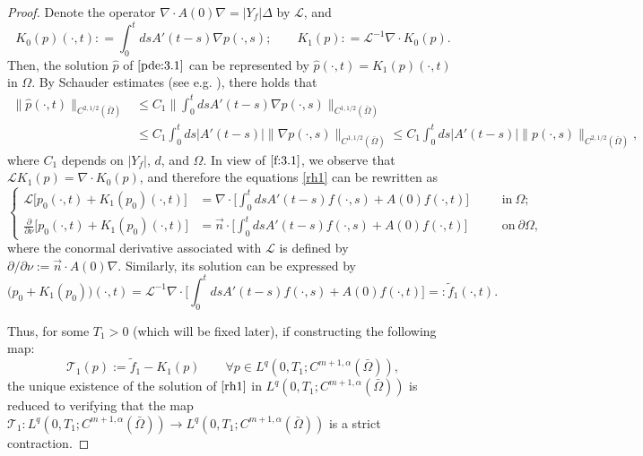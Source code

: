\documentclass[13pt,CJK]{article}
\theoremstyle{plain}                       %
\theoremstyle{remark}
\numberwithin{equation}{section}
\begin{document}
\begin{proof}
Denote the operator $\nabla\cdot A(0)\nabla =|Y_f|\Delta$
by $\mathcal{L}$, and
\begin{equation}\label{f:3.1}
  K_0(p)(\cdot,t): = \int_{0}^{t}dsA'(t-s)\nabla p(\cdot,s);
  \qquad
  K_1(p): = \mathcal{L}^{-1}\nabla\cdot K_0(p).
\end{equation}
Then, the solution $\hat{p}$ of $\eqref{pde:3.1}$ can be represented by
$\hat{p}(\cdot,t) = K_1(p)(\cdot,t)$ in $\Omega$.
By Schauder estimates (see e.g.
\cite[pp.89]{Giaquinta-Martinazzi12}), there holds that
\begin{equation}\label{pde2.28}
\begin{aligned}
\|\hat{p}(\cdot,t)\|_{C^{2,1/2}(\bar\Omega)}&\leq
C_1
\bigg\|\int_{0}^{t}ds
A'(t-s)\nabla p(\cdot,s)\bigg\|_{C^{1,1/2}(\bar\Omega)}\\
&\leq C_1
\int_{0}^{t}ds
|A'(t-s)|\|\nabla p(\cdot,s)\|_{C^{1,1/2}(\bar\Omega)}
\leq C_1\int_{0}^{t}ds
|A'(t-s)|\| p(\cdot,s)\|_{C^{2,1/2}(\bar\Omega)},
\end{aligned}
\end{equation}
where $C_1$ depends on $|Y_f|$, $d$, and $\Omega$.
In view of $\eqref{f:3.1}$, we observe that $\mathcal{L}K_1(p) =
\nabla\cdot K_0(p)$, and therefore the equations \eqref{rh1} can be rewritten as
\begin{equation*}
\left\{
\begin{aligned}
  \mathcal{L}\Big[p_0(\cdot,t)+K_1(p_0)(\cdot,t)\Big]  &=\nabla\cdot\Big[
  \int_{0}^tdsA'(t-s)f(\cdot,s)+A(0)f(\cdot,t)
  \Big]&\quad &\text{in}~\Omega;\\
 \frac{\partial}{\partial\nu}\Big[p_0(\cdot,t)+K_1(p_0)(\cdot,t)\Big]&=
  \vec{n}\cdot\Big[
  \int_{0}^tdsA'(t-s)f(\cdot,s)+A(0)f(\cdot,t)
  \Big]&\quad &\text{on}~\partial\Omega,
\end{aligned}\right.
\end{equation*}
where the conormal derivative associated with $\mathcal{L}$
is defined by $\partial/\partial\nu:=\vec{n}\cdot A(0)\nabla$.
Similarly, its solution can be expressed by
\begin{equation}\label{rh3}
  \big(p_0+K_1(p_0)\big)(\cdot,t)=\mathcal{L}^{-1}
  \nabla\cdot\Big[
  \int_{0}^tdsA'(t-s)f(\cdot,s)+A(0)f(\cdot,t)
  \Big]=:\tilde{f}_1(\cdot,t).
\end{equation}

Thus, for some $T_1>0$ (which will be fixed later), if constructing the
following map:
\begin{equation}\label{pde:3.2}
 \mathcal{T}_1(p) :=  \tilde{f}_1 - K_1(p)
 \qquad \forall p\in L^q(0,T_1; C^{m+1,\alpha}(\bar\Omega)),
\end{equation}
the unique existence of the solution of $\eqref{rh1}$ in
$L^q(0,T_1; C^{m+1,\alpha}(\bar\Omega))$ is reduced to verifying that the map
$\mathcal{T}_1: L^q(0,T_1; C^{m+1,\alpha}(\bar\Omega))\to L^q(0,T_1; C^{m+1,\alpha}(\bar\Omega))$ is a strict contraction.



\end{proof}
\end{document}
